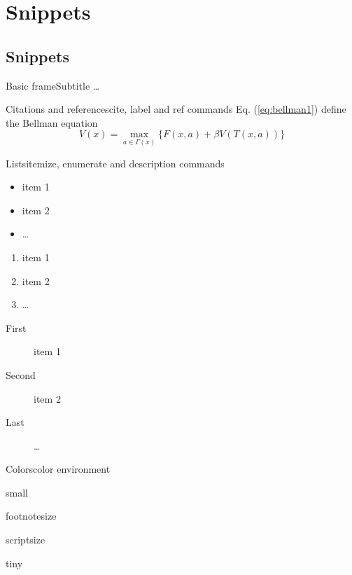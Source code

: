 \section{Snippets}

\subsection{Snippets}

\begin{frame}{Basic frame}{Subtitle}
    \dots
\end{frame}

\begin{frame}{Citations and references}{cite, label and ref commands}
    Eq. (\ref{eq:bellman1}) define the Bellman equation \cite{bellman57}
    \begin{equation}
        V(x) = \max_{a \in \Gamma (x) } \{ F(x,a) + \beta V(T(x,a)) \}  \label{eq:bellman1}
    \end{equation}
\end{frame}
\note{
}


\begin{frame}{Lists}{itemize, enumerate and description commands}
    \begin{itemize}
        \item item 1
        \item item 2
        \item \dots
    \end{itemize}

    \begin{enumerate}
        \item item 1
        \item item 2
        \item \dots
    \end{enumerate}

    \begin{description}
        \item[First] item 1
        \item[Second] item 2
        \item[Last] \dots
    \end{description}
\end{frame}
\note{
}


\begin{frame}{Colors}{color environment}
    \begin{small}
    small
    \end{small}

    \begin{footnotesize}
    footnotesize
    \end{footnotesize}

    \begin{scriptsize}
    scriptsize
    \end{scriptsize}

    \begin{tiny}
    tiny
    \end{tiny}
\end{frame}
\note{
}


